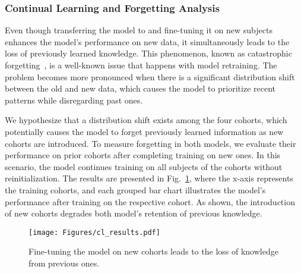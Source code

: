 \subsubsection{Continual Learning and Forgetting Analysis}
Even though transferring the model to and fine-tuning it on new subjects enhances the model's performance on new data, it simultaneously leads to the loss of previously learned knowledge. This phenomenon, known as catastrophic forgetting~\cite{kirkpatrick2017overcoming}, is a well-known issue that happens with model retraining. The problem becomes more pronounced when there is a significant distribution shift between the old and new data, which causes the model to prioritize recent patterns while disregarding past ones.

We hypothesize that a distribution shift exists among the four cohorts, which potentially causes the model to forget previously learned information as new cohorts are introduced. To measure forgetting in both models, we evaluate their performance on prior cohorts after completing training on new ones. In this scenario, the model continues training on all subjects of the cohorts without reinitialization. The results are presented in Fig.~\ref{fig:cl_results}, where the x-axis represents the training cohorts, and each grouped bar chart illustrates the model’s performance after training on the respective cohort. As shown, the introduction of new cohorts degrades both model’s retention of previous knowledge.
\begin{figure}
\vspace{-2mm}
    \centering
    \texttt{[image: Figures/cl\_results.pdf]}
    \caption{Fine-tuning the model on new cohorts leads to the loss of knowledge from previous ones.}
    \label{fig:cl_results}
    \vspace{-2mm}
\end{figure}